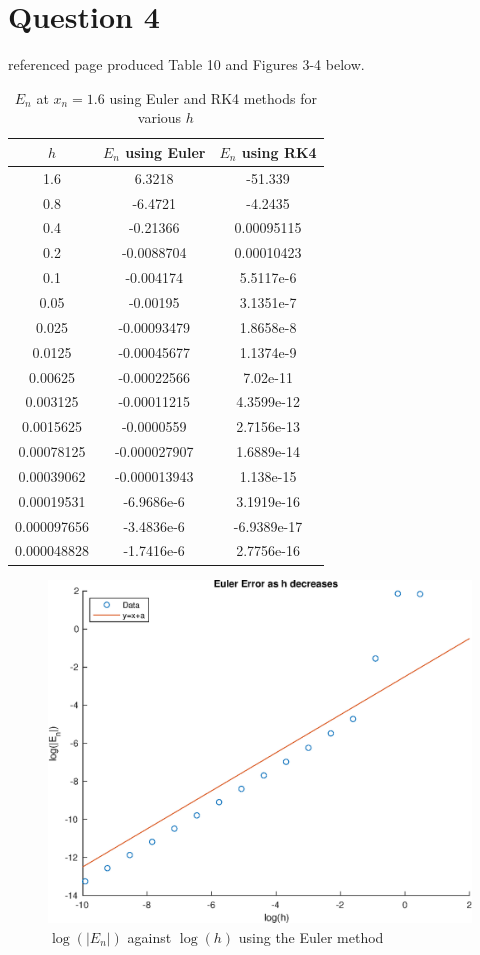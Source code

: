\documentclass[10pt,a4paper,notitlepage]{article}
\begin{document}
\section*{\centering \large Question 4}

 referenced page \pageref{subsec:Code 4.1} produced Table 10 and Figures 3-4 below. 
\begin{table}[H]
\centering
\begin{tabular}{|c|c|c|}
\hline $h$ & $E_{n}$ using Euler & $E_{n}$ using RK4 \\ \hline 1.6 & 6.3218 & -51.339\\ 0.8 & -6.4721 & -4.2435\\ 0.4 & -0.21366 & 0.00095115\\ 0.2 & -0.0088704 & 0.00010423\\ 0.1 & -0.004174 & 5.5117e-6\\ 0.05 & -0.00195 & 3.1351e-7\\ 0.025 & -0.00093479 & 1.8658e-8\\ 0.0125 & -0.00045677 & 1.1374e-9\\ 0.00625 & -0.00022566 & 7.02e-11\\ 0.003125 & -0.00011215 & 4.3599e-12\\ 0.0015625 & -0.0000559 & 2.7156e-13\\ 0.00078125 & -0.000027907 & 1.6889e-14\\ 0.00039062 & -0.000013943 & 1.138e-15\\ 0.00019531 & -6.9686e-6 & 3.1919e-16\\ 0.000097656 & -3.4836e-6 & -6.9389e-17\\ 0.000048828 & -1.7416e-6 & 2.7756e-16\\ \hline \end{tabular}
\caption{$E_{n}$ at $x_{n}=1.6$ using Euler and RK4 methods for various $h$}
\end{table}
\begin{figure}[H]
\begin{center}
\includegraphics[width=12cm]{Image_4_1}
\caption{$\log(|E_{n}|)$ against $\log(h)$ using the Euler method}
\end{center}
\end{figure}
\end{document}
